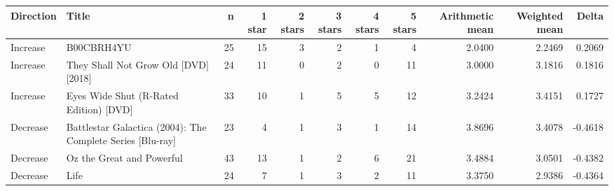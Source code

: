 \begin{tabular}{llrrrrrrrrr}
\hline
Direction & Title & n & 1 star & 2 stars & 3 stars & 4 stars & 5 stars & Arithmetic mean & Weighted mean & Delta \\
\hline
Increase & B00CBRH4YU & 25 & 15 & 3 & 2 & 1 & 4 & 2.0400 & 2.2469 & 0.2069 \\
\hline
Increase & They Shall Not Grow Old [DVD] [2018] & 24 & 11 & 0 & 2 & 0 & 11 & 3.0000 & 3.1816 & 0.1816 \\
\hline
Increase & Eyes Wide Shut (R-Rated Edition) [DVD] & 33 & 10 & 1 & 5 & 5 & 12 & 3.2424 & 3.4151 & 0.1727 \\
\hline
Decrease & Battlestar Galactica (2004): The Complete Series [Blu-ray] & 23 & 4 & 1 & 3 & 1 & 14 & 3.8696 & 3.4078 & -0.4618 \\
\hline
Decrease & Oz the Great and Powerful & 43 & 13 & 1 & 2 & 6 & 21 & 3.4884 & 3.0501 & -0.4382 \\
\hline
Decrease & Life & 24 & 7 & 1 & 3 & 2 & 11 & 3.3750 & 2.9386 & -0.4364 \\
\hline
\end{tabular}
